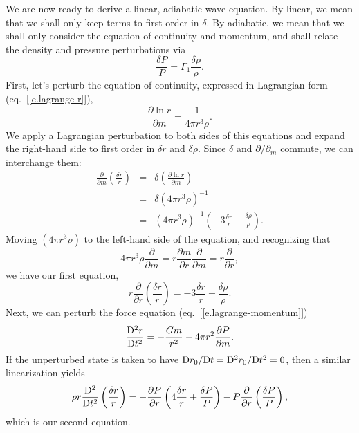 We are now ready to derive a linear, adiabatic wave equation. By linear, we mean that we shall only keep terms to first order in $\delta$.  By adiabatic, we mean that we shall only consider the equation of continuity and momentum, and shall relate the density and pressure perturbations via
\[ \frac{\delta P}{P} = \Gamma_{1}\frac{\delta \rho}{\rho}. \]
First, let's perturb the equation of continuity, expressed in Lagrangian form (eq.~[\ref{e.lagrange-r}]),
\[
\frac{\partial\ln r}{\partial m} = \frac{1}{4\pi r^{3}\rho}.
\]
We apply a Lagrangian perturbation to both sides of this equations and expand the right-hand side to first order in $\delta r$ and $\delta \rho$.  Since $\delta$ and $\partial/\partial_{m}$ commute, we can interchange them:
\begin{eqnarray*}
\frac{\partial}{\partial m}\left(\frac{\delta r}{r}\right) &=& \delta\left(\frac{\partial \ln r}{\partial m}\right)\\
	&=& \delta\left( 4\pi r^{3}\rho\right)^{-1} \\
	&=& \left(4\pi r^{3}\rho\right)^{-1}\left(-3 \frac{\delta r}{r} - \frac{\delta\rho}{\rho}\right).
\end{eqnarray*}
Moving $(4\pi r^{3}\rho)$ to the left-hand side of the equation, and recognizing that
\[ 4\pi r^{3}\rho \frac{\partial}{\partial m} = r\frac{\partial m}{\partial r}\frac{\partial }{\partial m} = r\frac{\partial }{\partial r}, \]
we have our first equation,
\begin{equation}\label{e.linearized-radial-continuity}
r\frac{\partial}{\partial r}\left(\frac{\delta r}{r}\right) = -3\frac{\delta r}{r} - \frac{\delta \rho}{\rho}.
\end{equation}
Next, we can perturb the force equation (eq.~[\ref{e.lagrange-momentum}])
\[
\frac{\mathrm{D}^{2} r}{\mathrm{D} t^{2}} = -\frac{Gm}{ r^{2}} - 4\pi r^{2}\frac{\partial P}{\partial m}.
\]
If the unperturbed state is taken to have $\mathrm{D} r_{0}/\mathrm{D} t = \mathrm{D}^{2} r_{0}/\mathrm{D} t^{2} = 0$, then a similar linearization yields
\begin{equation}\label{e.linearized-radial-momentum}
\rho r \frac{\mathrm{D}^{2} }{\mathrm{D} t^{2}}\left(\frac{\delta r}{r}\right) = -\frac{\partial P}{\partial r}\left(4\frac{\delta r}{r} + \frac{\delta P}{P}\right) - P \frac{\partial}{\partial r}\left(\frac{\delta P}{P}\right),
\end{equation}
which is our second equation.

